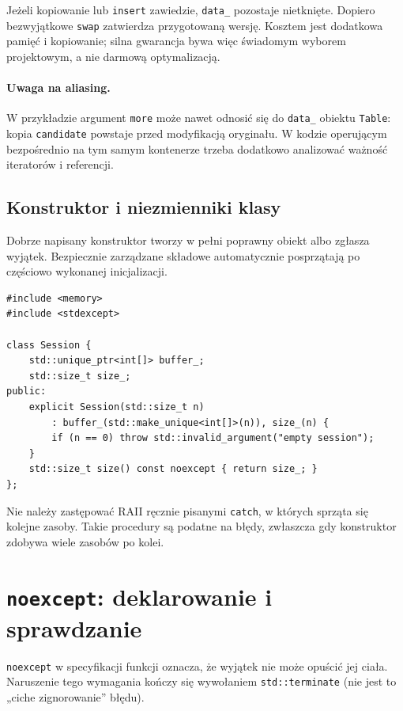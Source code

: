 Jeżeli kopiowanie lub \texttt{insert} zawiedzie, \texttt{data\_}
pozostaje nietknięte. Dopiero bezwyjątkowe \texttt{swap} zatwierdza
przygotowaną wersję. Kosztem jest dodatkowa pamięć i kopiowanie;
silna gwarancja bywa więc świadomym wyborem projektowym, a nie darmową
optymalizacją.

\paragraph{Uwaga na aliasing.}
W przykładzie argument \texttt{more} może nawet odnosić się do
\texttt{data\_} obiektu \texttt{Table}: kopia \texttt{candidate}
powstaje przed modyfikacją oryginału. W kodzie operującym bezpośrednio
na tym samym kontenerze trzeba dodatkowo analizować ważność iteratorów
i referencji.

\subsection{Konstruktor i niezmienniki klasy}

Dobrze napisany konstruktor tworzy w pełni poprawny obiekt albo
zgłasza wyjątek. Bezpiecznie zarządzane składowe automatycznie
posprzątają po częściowo wykonanej inicjalizacji.

\begin{lstlisting}
#include <memory>
#include <stdexcept>

class Session {
    std::unique_ptr<int[]> buffer_;
    std::size_t size_;
public:
    explicit Session(std::size_t n)
        : buffer_(std::make_unique<int[]>(n)), size_(n) {
        if (n == 0) throw std::invalid_argument("empty session");
    }
    std::size_t size() const noexcept { return size_; }
};
\end{lstlisting}

Nie należy zastępować RAII ręcznie pisanymi \texttt{catch}, w których
sprząta się kolejne zasoby. Takie procedury są podatne na błędy,
zwłaszcza gdy konstruktor zdobywa wiele zasobów po kolei.

\section{\texttt{noexcept}: deklarowanie i sprawdzanie}
\label{sec:cpp11-noexcept}

\texttt{noexcept} w specyfikacji funkcji oznacza, że wyjątek nie może
opuścić jej ciała. Naruszenie tego wymagania kończy się wywołaniem
\texttt{std::terminate} (nie jest to „ciche zignorowanie” błędu).

